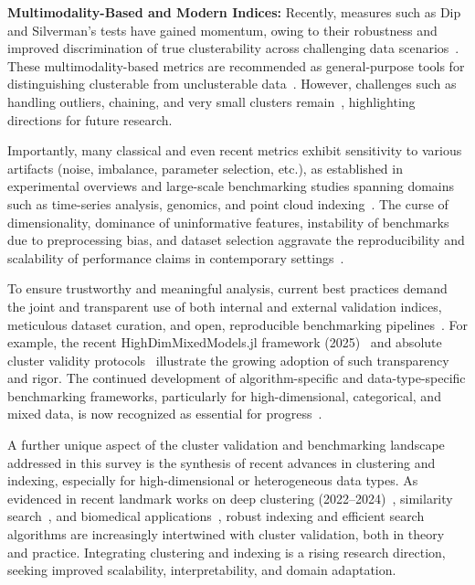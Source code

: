 \documentclass[sigconf]{acmart}
\begin{document}
\textbf{Multimodality-Based and Modern Indices:} Recently, measures such as Dip and Silverman’s tests have gained momentum, owing to their robustness and improved discrimination of true clusterability across challenging data scenarios~\cite{ref16,ref21,ref22,ref44,ref59,ref60,ref94}. These multimodality-based metrics are recommended as general-purpose tools for distinguishing clusterable from unclusterable data~\cite{ref59}. However, challenges such as handling outliers, chaining, and very small clusters remain~\cite{ref59}, highlighting directions for future research.

Importantly, many classical and even recent metrics exhibit sensitivity to various artifacts (noise, imbalance, parameter selection, etc.), as established in experimental overviews and large-scale benchmarking studies spanning domains such as time-series analysis, genomics, and point cloud indexing~\cite{ref14,ref46,ref50,ref59,ref67,ref71,ref74,ref78,ref92,ref94,ref96,ref97,ref100,ref113,ref116}. The curse of dimensionality, dominance of uninformative features, instability of benchmarks due to preprocessing bias, and dataset selection aggravate the reproducibility and scalability of performance claims in contemporary settings~\cite{ref14,ref67,ref116}.

To ensure trustworthy and meaningful analysis, current best practices demand the joint and transparent use of both internal and external validation indices, meticulous dataset curation, and open, reproducible benchmarking pipelines~\cite{ref22,ref46,ref74,ref90,ref96,ref97,ref100,ref113,ref116}. For example, the recent HighDimMixedModels.jl framework (2025)~\cite{ref100} and absolute cluster validity protocols~\cite{ref113} illustrate the growing adoption of such transparency and rigor. The continued development of algorithm-specific and data-type-specific benchmarking frameworks, particularly for high-dimensional, categorical, and mixed data, is now recognized as essential for progress~\cite{ref67,ref96,ref116}.

A further unique aspect of the cluster validation and benchmarking landscape addressed in this survey is the synthesis of recent advances in clustering and indexing, especially for high-dimensional or heterogeneous data types. As evidenced in recent landmark works on deep clustering (2022--2024)~\cite{ref21,ref22,ref67}, similarity search~\cite{ref44,ref45,ref46,ref77,ref78}, and biomedical applications~\cite{ref90,ref92,ref96,ref97,ref100,ref113,ref116}, robust indexing and efficient search algorithms are increasingly intertwined with cluster validation, both in theory and practice. Integrating clustering and indexing is a rising research direction, seeking improved scalability, interpretability, and domain adaptation.
\end{document}
